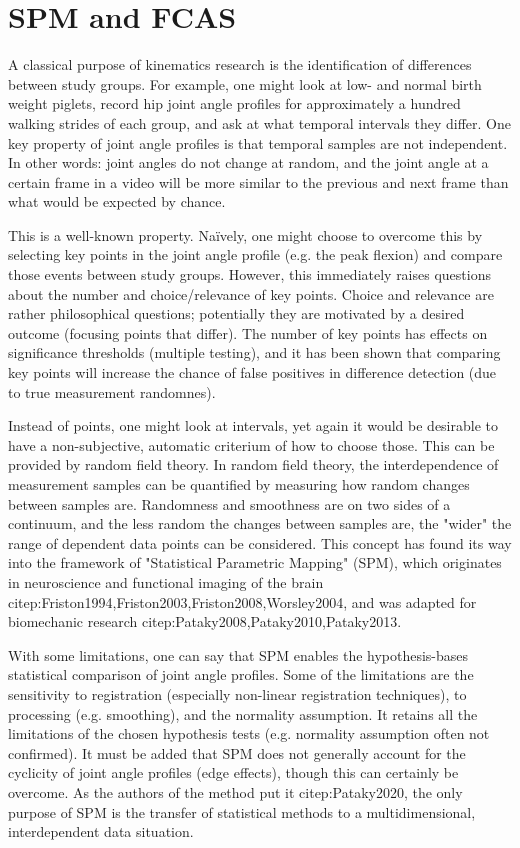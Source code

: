 

\section{SPM and FCAS}
\label{sec:org6db6772}
\begin{change}
A classical purpose of kinematics research is the identification of differences between study groups.
For example, one might look at low- and normal birth weight piglets, record hip joint angle profiles for approximately a hundred walking strides of each group, and ask at what temporal intervals they differ.
One key property of joint angle profiles is that temporal samples are not independent.
In other words: joint angles do not change at random, and the joint angle at a certain frame in a video will be more similar to the previous and next frame than what would be expected by chance.

This is a well-known property.
Naïvely, one might choose to overcome this by selecting key points in the joint angle profile (e.g. the peak flexion) and compare those events between study groups.
However, this immediately raises questions about the number and choice/relevance of key points.
Choice and relevance are rather philosophical questions; potentially they are motivated by a desired outcome (focusing points that differ).
The number of key points has effects on significance thresholds (multiple testing), and it has been shown that comparing key points will increase the chance of false positives in difference detection (due to true measurement randomnes).

Instead of points, one might look at intervals, yet again it would be desirable to have a non-subjective, automatic criterium of how to choose those.
This can be provided by random field theory.
In random field theory, the interdependence of measurement samples can be quantified by measuring how random changes between samples are.
Randomness and smoothness are on two sides of a continuum, and the less random the changes between samples are, the "wider" the range of dependent data points can be considered.
This concept has found its way into the framework of "Statistical Parametric Mapping" (SPM), which originates in neuroscience and functional imaging of the brain citep:Friston1994,Friston2003,Friston2008,Worsley2004, and was adapted for biomechanic research citep:Pataky2008,Pataky2010,Pataky2013.

With some limitations, one can say that SPM enables the hypothesis-bases statistical comparison of joint angle profiles.
Some of the limitations are the sensitivity to registration (especially non-linear registration techniques), to processing (e.g. smoothing), and the normality assumption.
It retains all the limitations of the chosen hypothesis tests (e.g. normality assumption often not confirmed).
It must be added that SPM does not generally account for the cyclicity of joint angle profiles (edge effects), though this can certainly be overcome.
As the authors of the method put it citep:Pataky2020, the only purpose of SPM is the transfer of statistical methods to a multidimensional, interdependent data situation.



\end{change}
